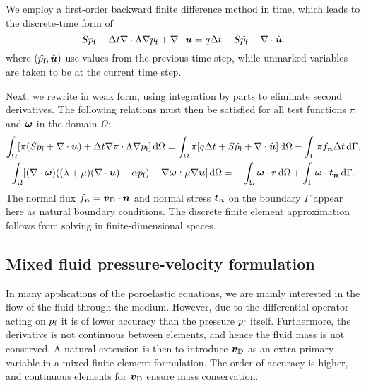 We employ a first-order backward finite difference method in time, which leads
to the discrete-time form of 
%
\begin{equation}
  \label{eq:time1}
  S p_{\text{f}} - \Delta t\nabla \cdot \Lambda \nabla p_{\text{f}}
  +  \nabla \cdot \boldsymbol{u} = q\Delta t + S \hat{p_{\text{f}}} + \nabla \cdot \hat{\boldsymbol{u}}.
\end{equation}
%
where $(\hat{p_{\text{f}}},\hat{\boldsymbol{u}})$ use values from the previous time step,
while unmarked variables are taken to be at the current time step.

Next, we rewrite  in
weak form, using integration by parts to eliminate second derivatives.
The following relations must then be satisfied for all test functions $\pi$ and
$\boldsymbol{\omega}$ in the domain $\Omega$:
%
\begin{gather}
  \label{eq:weakpress}
  \int_\Omega [
    \pi(
  S \Pf
  + \nabla \cdot \U)
  + \Delta t \nabla\pi \cdot \Lambda \nabla \Pf
  ] \D\Omega 
  = \int_\Omega \pi[
    q \Delta t
  + S \prev{\Pf}
  + \nabla \cdot \prev{\U}] \D\Omega
-\int_\Gamma \pi f_{\V{n}}\Delta t \D\Gamma,\\
%
\label{eq:weakdispl}
  \int_\Omega [
  (\nabla\cdot\V{\omega})((\lambda+\mu)(\nabla\cdot\U)
  -\alpha \Pf)
  +\nabla \V{\omega} : \mu  \nabla \U
  ] \D\Omega =
 - \int_\Omega \V{\omega} \cdot \V{r} \D\Omega + \int_\Gamma \V{\omega}
  \cdot \V{t}_{\V{n}} \D\Gamma.
\end{gather}
%
The normal flux $f_{\boldsymbol{n}}=\boldsymbol{v}_{\text{D}}\cdot\boldsymbol{n}$ and normal stress $\boldsymbol{t}_{\boldsymbol{n}}$ on the boundary
$\Gamma$ appear here as natural boundary conditions. 
The discrete finite element approximation follows from solving
 in finite-dimensional spaces.

\subsection{Mixed fluid pressure-velocity formulation}

In many applications of the poroelastic equations, we are mainly interested in
the flow of the fluid through the medium.
However, due to the differential operator acting on $p_{\text{f}}$ it is of lower accuracy than
the pressure $p_{\text{f}}$ itself.
Furthermore, the derivative is not continuous between elements, and hence the
fluid mass is not conserved.
A natural extension is then to introduce $\boldsymbol{v}_{\text{D}}$ as an extra primary variable in a mixed
finite element formulation.
The order of accuracy is higher, and continuous elements for $\boldsymbol{v}_{\text{D}}$ ensure mass
conservation.

